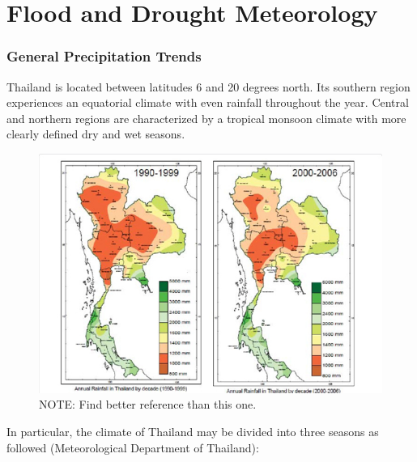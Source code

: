 \section{Flood and Drought Meteorology}

\subsubsection{General Precipitation Trends}

Thailand is located between latitudes 6 and 20 degrees north. Its southern region experiences an equatorial climate with even rainfall throughout the year. Central and northern regions are characterized by a tropical monsoon climate with more clearly defined dry and wet seasons. 

\begin{figure}[h]
	\centering
		\includegraphics[width=1.00\textwidth]{graphics/Annual_Rainfall_Thailand.jpg}
	\caption{NOTE: Find better reference than this one.}
	\label{fig:Annual_Rainfall_Thailand}
\end{figure}

In particular, the climate of Thailand may be divided into three seasons as followed (Meteorological Department of Thailand):  

